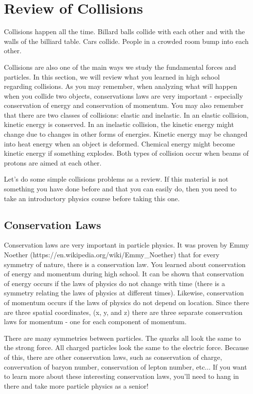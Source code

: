 \section{Review of Collisions}

Collisions happen all the time.  Billard balls collide with each other and with the walls of the billiard table.  Cars collide.  People in a crowded room bump into each other.

Collisions are also one of the main ways we study the fundamental forces and particles. In this section, we will review what you learned in high school regarding collisions.  As you may remember, when analyzing what will happen when you collide two objects, conservations laws are very important - especially conservation of energy and conservation of momentum.  You may also remember that there are two classes of collisions: elastic and inelastic.  In an elastic collision, kinetic energy is conserved. In an inelastic collision, the kinetic energy might change due to changes in other forms of energies. Kinetic energy may be changed into heat energy when an object is deformed. Chemical energy might become kinetic energy if something explodes. Both types of collision occur when beams of protons are aimed at each other.

Let's do some simple collisions problems as a review.  If this material is not something you have done before and that you can easily do, then you need to take an introductory physics course before taking this one.

\subsection{Conservation Laws}
Conservation laws are very important in particle physics.  It was proven by Emmy Noether (https://en.wikipedia.org/wiki/Emmy\_Noether) that for every symmetry of nature, there is a conservation law.  You learned about conservation of energy and momentum during high school. It can be shown that conservation of energy occurs if the laws of physics do not change with time (there is a symmetry relating the laws of physics at different times).  Likewise, conservation of momentum occurs if the laws of physics do not depend on location. Since there are three spatial coordinates, (x, y, and z) there are three separate conservation laws for momentum - one for each component of momentum. 

There are many symmetries between particles. The quarks all look the same to the strong force. All charged particles look the same to the electric force.  Because of this, there are other conservation laws, such as conservation of charge, convervation of baryon number, conservation of lepton number, etc... If you want to learn more about these interesting conservation laws, you'll need to hang in there and take more particle physics as a senior! 

